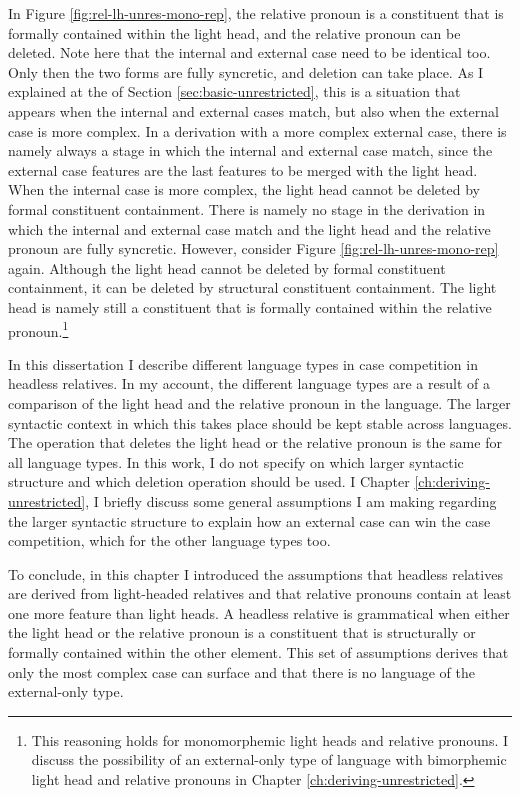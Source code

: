 In Figure \ref{fig:rel-lh-unres-mono-rep}, the relative pronoun is a constituent that is formally contained within the light head, and the relative pronoun can be deleted. Note here that the internal and external case need to be identical too. Only then the two forms are fully syncretic, and deletion can take place.
As I explained at the of Section \ref{sec:basic-unrestricted}, this is a situation that appears when the internal and external cases match, but also when the external case is more complex. In a derivation with a more complex external case, there is namely always a stage in which the internal and external case match, since the external case features are the last features to be merged with the light head.
When the internal case is more complex, the light head cannot be deleted by formal constituent containment. There is namely no stage in the derivation in which the internal and external case match and the light head and the relative pronoun are fully syncretic.
However, consider Figure \ref{fig:rel-lh-unres-mono-rep} again.
Although the light head cannot be deleted by formal constituent containment, it can be deleted by structural constituent containment. The light head is namely still a constituent that is formally contained within the relative pronoun.\footnote{This reasoning holds for monomorphemic light heads and relative pronouns. I discuss the possibility of an external-only type of language with bimorphemic light head and relative pronouns in Chapter \ref{ch:deriving-unrestricted}.}

In this dissertation I describe different language types in case competition in headless relatives. In my account, the different language types are a result of a comparison of the light head and the relative pronoun in the language.
The larger syntactic context in which this takes place should be kept stable across languages. The operation that deletes the light head or the relative pronoun is the same for all language types. In this work, I do not specify on which larger syntactic structure and which deletion operation should be used. I Chapter \ref{ch:deriving-unrestricted}, I briefly discuss some general assumptions I am making regarding the larger syntactic structure to explain how an external case can win the case competition, which for the other language types too.

To conclude, in this chapter I introduced the assumptions that headless relatives are derived from light-headed relatives and that relative pronouns contain at least one more feature than light heads. A headless relative is grammatical when either the light head or the relative pronoun is a constituent that is structurally or formally contained within the other element. This set of assumptions derives that only the most complex case can surface and that there is no language of the external-only type.

